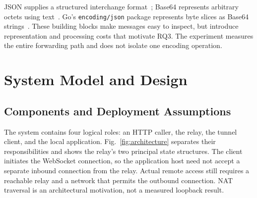 \documentclass[conference,letterpaper]{IEEEtran}
\newcommand{\code}[1]{\texttt{#1}}
\begin{document}
JSON supplies a structured interchange format~\cite{json}; Base64 represents
arbitrary octets using text~\cite{base64}. Go's \code{encoding/json} package
represents byte slices as Base64 strings~\cite{gojson}. These building blocks
make messages easy to inspect, but introduce representation and processing costs
that motivate RQ3. The experiment measures the entire forwarding path and does
not isolate one encoding operation.

\section{System Model and Design}
\subsection{Components and Deployment Assumptions}
The system contains four logical roles: an HTTP caller, the relay, the tunnel
client, and the local application. Fig.~\ref{fig:architecture} separates their
responsibilities and shows the relay's two principal state structures. The
client initiates the WebSocket connection, so the application host need not
accept a separate inbound connection from the relay. Actual remote access still
requires a reachable relay and a network that permits the outbound connection.
NAT traversal is an architectural motivation, not a measured loopback result.
\end{document}
